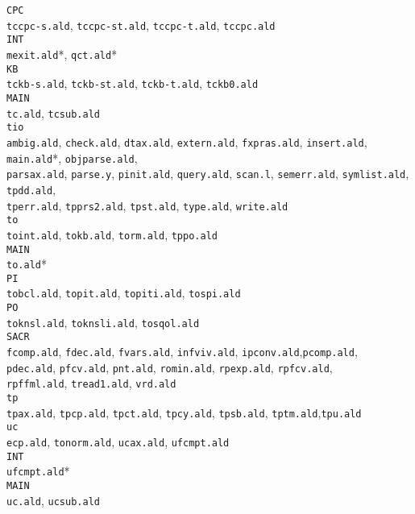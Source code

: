 {\begin{tabbing}
       {\tt CPC} \+ \\
          {\tt tccpc-s.ald},
          {\tt tccpc-st.ald},
          {\tt tccpc-t.ald},
          {\tt tccpc.ald} \- \\
       {\tt INT} \+ \\
          {\tt mexit.ald}*,
          {\tt qct.ald}* \- \\
       {\tt KB} \+ \\
          {\tt tckb-s.ald},
          {\tt tckb-st.ald},
          {\tt tckb-t.ald},
          {\tt tckb0.ald} \- \\
       {\tt MAIN} \+ \\
          {\tt tc.ald}, {\tt tcsub.ald} \- \- \\
  {\tt tio} \+ \\
      {\tt ambig.ald}, {\tt check.ald}, {\tt dtax.ald}, {\tt extern.ald},
      {\tt fxpras.ald}, {\tt insert.ald}, {\tt main.ald}*,
      {\tt objparse.ald}, \\
      {\tt parsax.ald}, {\tt parse.y}, {\tt pinit.ald}, {\tt query.ald},
      {\tt scan.l}, {\tt semerr.ald}, {\tt symlist.ald}, {\tt tpdd.ald}, \\
      {\tt tperr.ald}, {\tt tpprs2.ald}, {\tt tpst.ald}, {\tt type.ald}, 
      {\tt write.ald} \- \\
    {\tt to} \+ \\
    {\tt toint.ald},
    {\tt tokb.ald},
    {\tt torm.ald},
    {\tt tppo.ald} \\
    {\tt MAIN} \+ \\
              {\tt to.ald}* \- \\
    {\tt PI} \+ \\
              {\tt tobcl.ald}, {\tt topit.ald}, {\tt topiti.ald}, 
              {\tt tospi.ald} \- \\
    {\tt PO} \+ \\
              {\tt toknsl.ald},
              {\tt toknsli.ald},
              {\tt tosqol.ald} \- \\
    {\tt SACR} \+ \\
              {\tt fcomp.ald}, {\tt fdec.ald},  {\tt fvars.ald}, 
              {\tt infviv.ald}, {\tt ipconv.ald},{\tt pcomp.ald}, \\
              {\tt pdec.ald},  {\tt pfcv.ald}, {\tt pnt.ald},
              {\tt romin.ald}, {\tt rpexp.ald},  {\tt rpfcv.ald}, \\
              {\tt rpffml.ald}, {\tt tread1.ald},  {\tt vrd.ald} \- \- \\
    {\tt tp} \+ \\
    {\tt tpax.ald}, {\tt tpcp.ald}, {\tt tpct.ald}, {\tt tpcy.ald}, 
    {\tt tpsb.ald},  {\tt tptm.ald},{\tt tpu.ald} \- \\
    {\tt uc} \+ \\
      {\tt ecp.ald}, {\tt tonorm.ald}, {\tt ucax.ald}, {\tt ufcmpt.ald} \\
      {\tt INT} \+ \\
         {\tt ufcmpt.ald}* \- \\
      {\tt MAIN} \+ \\
         {\tt uc.ald}, {\tt ucsub.ald} \- \- \\
\end{tabbing}
}

